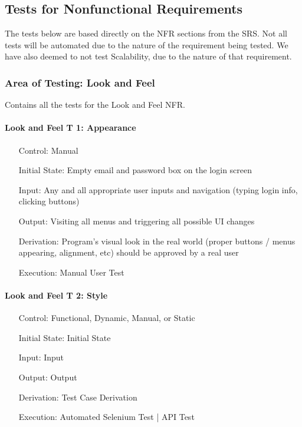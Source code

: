 \documentclass[12pt, titlepage]{article}
\begin{document}
\subsection{Tests for Nonfunctional Requirements}



The tests below are based directly on the NFR sections from the SRS. Not all tests will be automated due to the nature of the requirement being tested.
We have also deemed to not test Scalability, due to the nature of that requirement.

\subsubsection{Area of Testing: Look and Feel}

Contains all the tests for the Look and Feel NFR.

\paragraph*{Look and Feel T 1: Appearance}
\begin{itemize}
	\item[Control:] Manual
	\item[Initial State:] Empty email and password box on the login screen
	\item[Input:] Any and all appropriate user inputs and navigation (typing login info, clicking buttons)
	\item[Output:] Visiting all menus and triggering all possible UI changes
	\item[Derivation:] Program's visual look in the real world (proper buttons / menus appearing, alignment, etc) should be approved by a real user
	\item[Execution:] Manual User Test
\end{itemize}

\paragraph*{Look and Feel T 2: Style}
\begin{itemize}
	\item[Control:] Functional, Dynamic, Manual, or Static
	\item[Initial State:] Initial State
	\item[Input:] Input
	\item[Output:] Output
	\item[Derivation:] Test Case Derivation
	\item[Execution:] Automated Selenium Test | API Test
\end{itemize}
\end{document}
